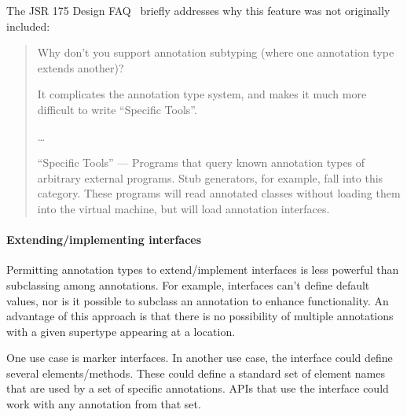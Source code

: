 \documentclass[10pt]{article}
\begin{document}
The JSR 175 Design FAQ~\cite{JSR175-PFD2} briefly addresses why this
feature was not originally included:

\begin{quote}
Why don't you support annotation subtyping (where one annotation type
extends another)?

It complicates the annotation type system, and makes it much more difficult
to write ``Specific Tools''.

\ldots

``Specific Tools'' --- Programs that query known annotation types of
arbitrary external programs. Stub generators, for example, fall into this
category. These programs will read annotated classes without loading them
into the virtual machine, but will load annotation interfaces.
\end{quote}




\paragraph{Extending/implementing interfaces}



Permitting annotation types to extend/implement interfaces is less
powerful than subclassing among annotations.
For example, interfaces can't define default values, nor is it possible
to subclass an annotation to enhance functionality.
An advantage of this approach is that there is no possibility of multiple
annotations with a given supertype appearing at a location.

One use case is marker interfaces.
%
In another use case, the interface could define several elements/methods.
These could define a standard set of element names that are used by a set
of specific annotations.  APIs that use the interface could work with any
annotation from that set.
\end{document}
